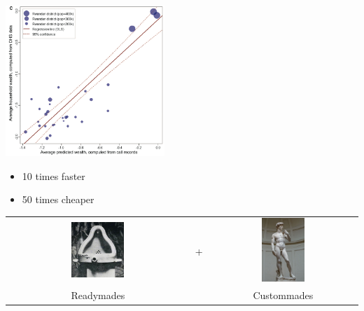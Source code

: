 \documentclass[aspectratio=169]{beamer}
\def\vf{\vfill}
\begin{document}
\begin{frame}

\begin{center}
\includegraphics[width=0.45\textwidth]{figures/blumenstock_predicting_2015_fig3c}
\end{center}

\pause

\begin{itemize}
\item 10 times faster
\item 50 times cheaper
\end{itemize}

\end{frame}
\begin{frame}

\begin{center}
\begin{tabular}{ccc}
\includegraphics[width=0.30\textwidth]{figures/duchamp_fountain} & \phantom{12} \LARGE{+} \phantom{12} & \includegraphics[width=0.30\textwidth]{figures/michelangelo_david} \\
\LARGE{Readymades} &  & \LARGE{Custommades}
\end{tabular}
\end{center}

\vf
\vspace{0.2in}
\\

\end{frame}
\end{document}

